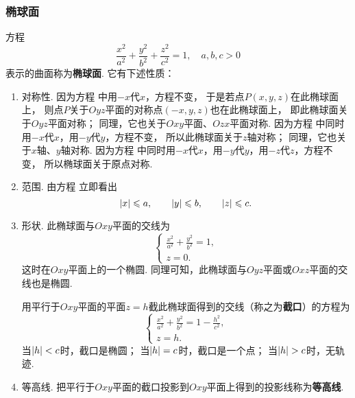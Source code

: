 \subsubsection{椭球面}
方程\begin{equation}\label{equation:解析几何.椭球面的一般方程}
	\frac{x^2}{a^2}+\frac{y^2}{b^2}+\frac{z^2}{c^2}=1,
	\quad a,b,c>0
\end{equation}
表示的曲面称为\textbf{椭球面}.
它有下述性质：
\begin{enumerate}
	\item 对称性.
	因为方程  中用\(-x\)代\(x\)，方程不变，
	于是若点\(P(x,y,z)\)在此椭球面上，
	则点\(P\)关于\(Oyz\)平面的对称点\((-x,y,z)\)也在此椭球面上，
	即此椭球面关于\(Oyz\)平面对称；
	同理，它也关于\(Oxy\)平面、\(Ozx\)平面对称.
	因为方程  中同时用\(-x\)代\(x\)，用\(-y\)代\(y\)，方程不变，
	所以此椭球面关于\(z\)轴对称；
	同理，它也关于\(x\)轴、\(y\)轴对称.
	因为方程  中同时用\(-x\)代\(x\)，用\(-y\)代\(y\)，用\(-z\)代\(z\)，方程不变，
	所以椭球面关于原点对称.

	\item 范围.
	由方程  立即看出\[
		\abs{x} \leqslant a, \qquad
		\abs{y} \leqslant b, \qquad
		\abs{z} \leqslant c.
	\]

	\item 形状.
	此椭球面与\(Oxy\)平面的交线为\[
		\left\{ \begin{array}{l}
			\frac{x^2}{a^2}+\frac{y^2}{b^2}=1, \\
			z = 0.
		\end{array} \right.
	\]
	这时在\(Oxy\)平面上的一个椭圆.
	同理可知，此椭球面与\(Oyz\)平面或\(Oxz\)平面的交线也是椭圆.

	用平行于\(Oxy\)平面的平面\(z = h\)截此椭球面得到的交线（称之为\textbf{截口}）的方程为\[
		\left\{ \begin{array}{l}
			\frac{x^2}{a^2}+\frac{y^2}{b^2}=1-\frac{h^2}{c^2}, \\
			z = h.
		\end{array} \right.
	\]
	当\(\abs{h} < c\)时，截口是椭圆；
	当\(\abs{h} = c\)时，截口是一个点；
	当\(\abs{h} > c\)时，无轨迹.
	
	\item 等高线.
	把平行于\(Oxy\)平面的截口投影到\(Oxy\)平面上得到的投影线称为\textbf{等高线}.
\end{enumerate}

